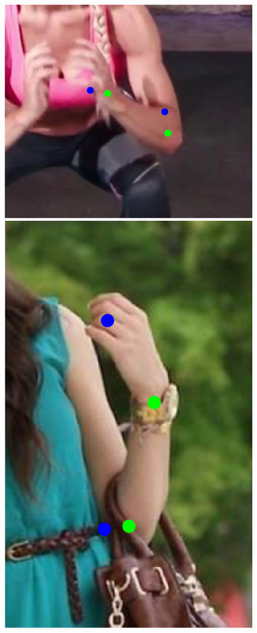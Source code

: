 \documentclass[10pt,twocolumn,letterpaper]{article}
\begin{document}
\begin{figure}[t!]
    \includegraphics[height=\ofh]{arm_all}
    \includegraphics[height=\ofh]{arm2_all}

\end{figure}
\end{document}
